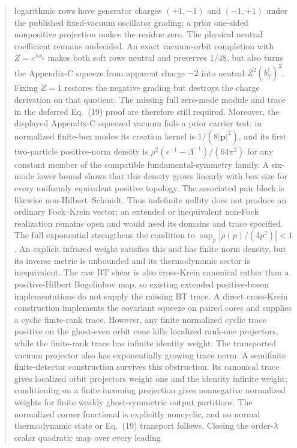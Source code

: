 \documentclass[11pt]{article}
\theoremstyle{definition}
\theoremstyle{remark}
\begin{document}
\begin{abstract}
logarithmic rows have generator charges $(+1,-1)$ and $(-1,+1)$ under the
published fixed-vacuum oscillator grading; a prior one-sided nonpositive
projection makes the residue zero.  The physical neutral coefficient remains
undecided.  An exact vacuum-orbit completion with
$Z=e^{\lambda\phi_0}$ makes both soft rows neutral and preserves $1/48$, but
also turns the Appendix-C squeeze from apparent charge $-2$ into neutral
$Z^2(b_\Upsilon^\dagger)^2$.  Fixing $Z=1$ restores the negative grading but
destroys the charge derivation on that quotient.  The missing full zero-mode
module and trace in the deferred Eq.~(19) proof are therefore still required.
Moreover, the displayed Appendix-C squeezed vacuum fails a prior carrier
test: in normalized finite-box modes its creation kernel is
$1/(8|\mathbf p|^2)$, and its first two-particle positive-norm density is
$\rho^2(\epsilon^{-1}-\Lambda^{-1})/(64\pi^2)$ for any constant member of
the compatible fundamental-symmetry family.  A six-mode lower bound shows
that this density grows linearly with box size for every uniformly equivalent
positive topology.  The associated pair block is likewise non-Hilbert--Schmidt.
Thus indefinite nullity does not produce an ordinary Fock--Krein vector;
an extended or inequivalent non-Fock realization remains open and would need
its domains and trace specified.
The full exponential strengthens the condition to
$\sup_p|\rho(p)/(4p^2)|<1$.  An explicit infrared weight satisfies this and
has finite norm density, but its inverse metric is unbounded and its
thermodynamic sector is inequivalent.  The raw BT shear is also cross-Krein
canonical rather than a positive-Hilbert Bogoliubov map, so existing extended
positive-boson implementations do not supply the missing BT trace.  A direct
cross-Krein construction implements the covariant squeeze on paired
cores and supplies a cyclic finite-rank trace.  However, any finite normalized
cyclic trace positive on the ghost-even orbit cone kills localized rank-one
projectors, while the finite-rank trace has infinite identity weight.  The
transported vacuum projector also has exponentially growing trace norm.
A semifinite finite-detector construction survives this obstruction.  Its
canonical trace gives localized orbit projectors weight one and the identity
infinite weight; conditioning on a finite incoming projection gives
nonnegative normalized weights for finite weakly ghost-symmetric output
partitions.  The normalized corner functional is explicitly noncyclic, and no
normal thermodynamic state or Eq.~(19) transport follows.
Closing the order-$\lambda$ scalar quadratic map over every leading

\end{abstract}
\end{document}
